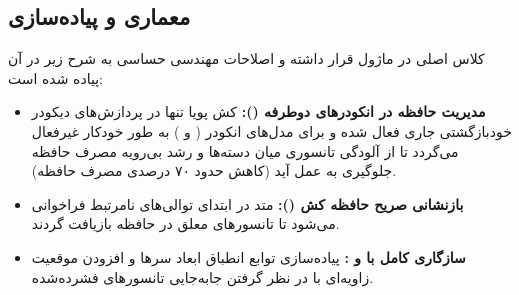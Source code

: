 \subsection{معماری و پیاده‌سازی}
کلاس اصلی  در ماژول  قرار داشته و اصلاحات مهندسی حساسی به شرح زیر در آن پیاده شده است:
\begin{itemize}
    \item \textbf{مدیریت حافظه در انکودرهای دوطرفه ():} کش پویا تنها در پردازش‌های دیکودر خودبازگشتی جاری فعال شده و برای مدل‌های انکودر ( و ) به طور خودکار غیرفعال می‌گردد تا از آلودگی تانسوری میان دسته‌ها و رشد بی‌رویه مصرف حافظه جلوگیری به عمل آید (کاهش حدود ۷۰ درصدی مصرف حافظه).
    \item \textbf{بازنشانی صریح حافظه کش ():} متد  در ابتدای توالی‌های نامرتبط فراخوانی می‌شود تا تانسورهای معلق در حافظه بازیافت گردند.
    \item \textbf{سازگاری کامل با  و :} پیاده‌سازی توابع انطباق ابعاد سرها و افزودن موقعیت زاویه‌ای با در نظر گرفتن جابه‌جایی تانسورهای فشرده‌شده.
\end{itemize}
